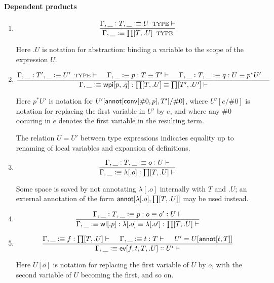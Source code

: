 \documentclass[11pt]{article}
\newcommand{\eqd}{\equiv}
\newcommand{\spc}{{\,\,\,\,\,\,\,}}
\newcommand{\ccolon}[1]{\vcentcolon#1}
\newcommand{\ccheck}[1]{\vcentcolon#1}  %
\newcommand{\csynth}[1]{\vcentcolon\vcentcolon #1} %
\newcommand{\Type}{\mathop{\text{ \sc type}}}
\newcommand{\Okay}{\mathop{\text{ \sc okay}}}
\newcommand{\Context}{\vdash\Okay}
\renewcommand{\Context}{\vdash}
\newcommand{\ha}[2]{#1[#2]}
\newcommand{\annot}{{\sf annot}}
\newcommand{\haa}[2]{\ha\annot{#1,#2}}
\newcommand{\conv}{{\sf conv}}
\newcommand{\ev}{{\sf ev}}
\newcommand{\wl}{{\sf wl}}
\newcommand{\wpi}{{\sf wpi}}
\newcommand{\var}{\char`_}
\newcommand{\defn}{\vcentcolon\equiv}
\begin{document}
\paragraph{Dependent products}

\begin{enumerate}

\item 
\[\frac{ \Gamma, \var \ccolon{T}, \var \defn U\Type \Context }{\Gamma, \var \defn \ha\prod{T,.U}\Type}\]

Here $.U$ is notation for abstraction: binding a variable to the scope of the expression $U$.

\item 
\[ \frac{ 
  \Gamma, \var \ccolon{T'}, \var \defn U'  \Type \Context \spc 
  \Gamma, \var \defn p:T \eqd T' \Context \spc
  \Gamma,  \var \ccolon{T}, \var \defn q:U \eqd p^*U' \spc
  } {
  \Gamma, \var \defn \ha\wpi{p,.q}:\ha\prod{T,.U}\eqd \ha\prod{T',.U'} \Context
}\]

Here ${p}^*U'$ is notation for $U'[\haa {\ha\conv{\#0,p}} {T'} /\#0]$, where
$U'[e/\#0]$ is notation for replacing the first variable in $U'$ by $e$, and
where any $\#0$ occuring in $e$ denotes the first variable in the resulting
term.

The relation $U = U'$ between type expressions indicates equality up to
renaming of local variables and expansion of definitions.

\item 
\[\frac{
  \Gamma, \var \ccolon{T}, \var\defn o \ccheck{U} \Context
}{\Gamma, \var\defn \ha\lambda{.o} \ccheck{\ha\prod{T,.U}} \Context}
\]

Some space is saved by not annotating $\ha\lambda{.o}$ internally with $T$ and
$.U$; an external annotation of the form $\haa {\ha\lambda{.o}} {\ha\prod{T,.U}} $ may be used instead.

\item 
\[\frac{
  \Gamma, \var \ccolon{T}, \var\defn p : o\eqd o' \ccheck{U} \Context
}{
  \Gamma, \var\defn \ha\wl{.p} : \ha\lambda{.o}\eqd \ha\lambda{.o'} : \ha\prod{T,.U} \Context
}\]

\item 
\[\frac{
  \Gamma, \var\defn f \ccheck{\ha\prod{T,.U}} \Context
  \spc 
  \Gamma, \var\defn t \ccheck{T}\Context
  \spc
  U' = U[\haa t T]
}{
  \Gamma, \var\defn \ha \ev{f,t,T,.U} \csynth{U'} \Context
}\]

Here $U[o]$ is notation for replacing the first variable of $U$ by $o$, with
the second variable of $U$ becoming the first, and so on.  


\end{enumerate}
\end{document}
